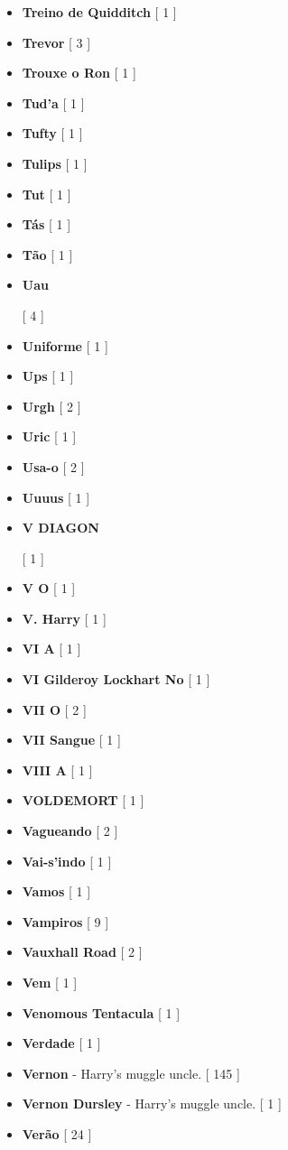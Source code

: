 \documentclass[a4paper]{article}
\begin{document}
{\begin{itemize}
	\item \textbf{Treino de Quidditch} [ 1 ]
	\item \textbf{Trevor} [ 3 ]
	\item \textbf{Trouxe o Ron} [ 1 ]
	\item \textbf{Tud'a} [ 1 ]
	\item \textbf{Tufty} [ 1 ]
	\item \textbf{Tulips} [ 1 ]
	\item \textbf{Tut} [ 1 ]
	\item \textbf{Tás} [ 1 ]
	\item \textbf{Tão} [ 1 ]
	\item \hypertarget{U}{\textbf{Uau}} [ 4 ]
	\item \textbf{Uniforme} [ 1 ]
	\item \textbf{Ups} [ 1 ]
	\item \textbf{Urgh} [ 2 ]
	\item \textbf{Uric} [ 1 ]
	\item \textbf{Usa-o} [ 2 ]
	\item \textbf{Uuuus} [ 1 ]
	\item \hypertarget{V}{\textbf{V DIAGON}} [ 1 ]
	\item \textbf{V O} [ 1 ]
	\item \textbf{V. Harry} [ 1 ]
	\item \textbf{VI A} [ 1 ]
	\item \textbf{VI Gilderoy Lockhart No} [ 1 ]
	\item \textbf{VII O} [ 2 ]
	\item \textbf{VII Sangue} [ 1 ]
	\item \textbf{VIII A} [ 1 ]
	\item \textbf{VOLDEMORT} [ 1 ]
	\item \textbf{Vagueando} [ 2 ]
	\item \textbf{Vai-s'indo} [ 1 ]
	\item \textbf{Vamos} [ 1 ]
	\item \textbf{Vampiros} [ 9 ]
	\item \textbf{Vauxhall Road} [ 2 ]
	\item \textbf{Vem} [ 1 ]
	\item \textbf{Venomous Tentacula} [ 1 ]
	\item \textbf{Verdade} [ 1 ]
	\item \textbf{Vernon} - Harry's muggle uncle. [ 145 ]
	\item \textbf{Vernon Dursley} - Harry's muggle uncle. [ 1 ]
	\item \textbf{Verão} [ 24 ]

\end{itemize}}
\end{document}
